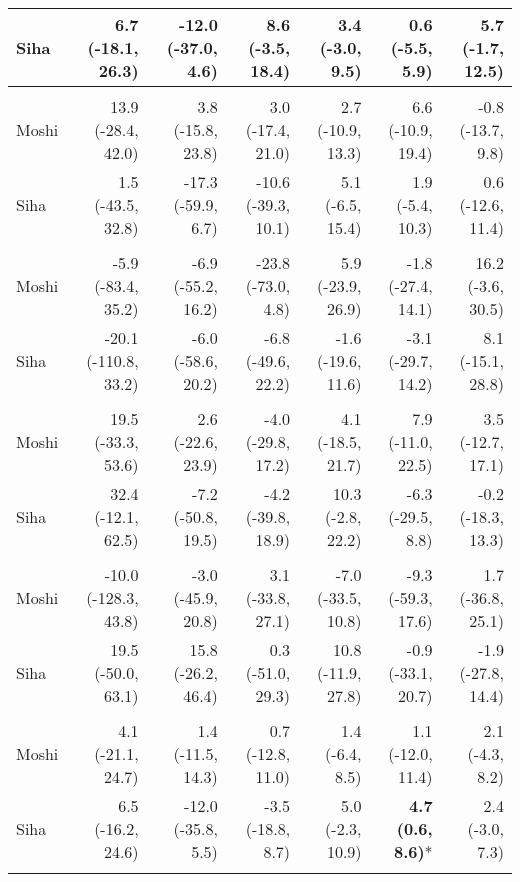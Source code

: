 \begin{table}[t]
\begin{tabular*}{\linewidth}{@{\extracolsep{\fill}}l|rrrrrr}
Siha & 6.7 (-18.1, 26.3) & -12.0 (-37.0, 4.6) & 8.6 (-3.5, 18.4) & 3.4 (-3.0, 9.5) & 0.6 (-5.5, 5.9) & 5.7 (-1.7, 12.5) \\ 
\midrule\addlinespace[2.5pt]
\multicolumn{7}{l}{Epilepsy} \\[2.5pt] 
\midrule\addlinespace[2.5pt]
Moshi & 13.9 (-28.4, 42.0) & 3.8 (-15.8, 23.8) & 3.0 (-17.4, 21.0) & 2.7 (-10.9, 13.3) & 6.6 (-10.9, 19.4) & -0.8 (-13.7, 9.8) \\ 
Siha & 1.5 (-43.5, 32.8) & -17.3 (-59.9, 6.7) & -10.6 (-39.3, 10.1) & 5.1 (-6.5, 15.4) & 1.9 (-5.4, 10.3) & 0.6 (-12.6, 11.4) \\ 
\midrule\addlinespace[2.5pt]
\multicolumn{7}{l}{Neuroses} \\[2.5pt] 
\midrule\addlinespace[2.5pt]
Moshi & -5.9 (-83.4, 35.2) & -6.9 (-55.2, 16.2) & -23.8 (-73.0, 4.8) & 5.9 (-23.9, 26.9) & -1.8 (-27.4, 14.1) & 16.2 (-3.6, 30.5) \\ 
Siha & -20.1 (-110.8, 33.2) & -6.0 (-58.6, 20.2) & -6.8 (-49.6, 22.2) & -1.6 (-19.6, 11.6) & -3.1 (-29.7, 14.2) & 8.1 (-15.1, 28.8) \\ 
\midrule\addlinespace[2.5pt]
\multicolumn{7}{l}{Psychoses} \\[2.5pt] 
\midrule\addlinespace[2.5pt]
Moshi & 19.5 (-33.3, 53.6) & 2.6 (-22.6, 23.9) & -4.0 (-29.8, 17.2) & 4.1 (-18.5, 21.7) & 7.9 (-11.0, 22.5) & 3.5 (-12.7, 17.1) \\ 
Siha & 32.4 (-12.1, 62.5) & -7.2 (-50.8, 19.5) & -4.2 (-39.8, 18.9) & 10.3 (-2.8, 22.2) & -6.3 (-29.5, 8.8) & -0.2 (-18.3, 13.3) \\ 
\midrule\addlinespace[2.5pt]
\multicolumn{7}{l}{Dysentery} \\[2.5pt] 
\midrule\addlinespace[2.5pt]
Moshi & -10.0 (-128.3, 43.8) & -3.0 (-45.9, 20.8) & 3.1 (-33.8, 27.1) & -7.0 (-33.5, 10.8) & -9.3 (-59.3, 17.6) & 1.7 (-36.8, 25.1) \\ 
Siha & 19.5 (-50.0, 63.1) & 15.8 (-26.2, 46.4) & 0.3 (-51.0, 29.3) & 10.8 (-11.9, 27.8) & -0.9 (-33.1, 20.7) & -1.9 (-27.8, 14.4) \\ 
\midrule\addlinespace[2.5pt]
\multicolumn{7}{l}{Intestinal Worms} \\[2.5pt] 
\midrule\addlinespace[2.5pt]
Moshi & 4.1 (-21.1, 24.7) & 1.4 (-11.5, 14.3) & 0.7 (-12.8, 11.0) & 1.4 (-6.4, 8.5) & 1.1 (-12.0, 11.4) & 2.1 (-4.3, 8.2) \\ 
Siha & 6.5 (-16.2, 24.6) & -12.0 (-35.8, 5.5) & -3.5 (-18.8, 8.7) & 5.0 (-2.3, 10.9) & \textbf{4.7 (0.6, 8.6)}* & 2.4 (-3.0, 7.3) \\ 
\midrule\addlinespace[2.5pt]

\end{tabular*}
\end{table}
